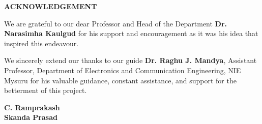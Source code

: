 \documentclass[./A14_Report.tex]{subfiles}
\begin{document}
\begin{center}
    \huge \textbf{ACKNOWLEDGEMENT}
\end{center}
\vspace{3cm}
We are grateful to our dear Professor and Head of the Department \textbf{Dr.
Narasimha Kaulgud} for his support and encouragement as it was his idea that
inspired this endeavour.
\par
We sincerely extend our thanks to our guide \textbf{Dr. Raghu J. Mandya},
Assistant Professor, Department of Electronics and Communication Engineering,
NIE Mysuru for his valuable guidance, constant assistance, and support for the
betterment of this project.
\\
\begin{flushright}
    \textbf{C. Ramprakash}\\
    \textbf{Skanda Prasad}
\end{flushright}
\restoregeometry
\end{document}
